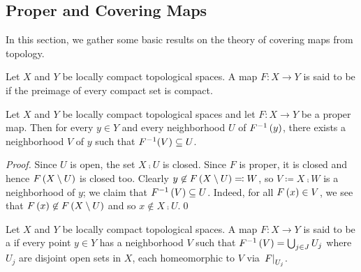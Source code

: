 \documentclass[../Moduli_Spaces_of_Riemann_Surfaces.tex]{subfiles}
\begin{document}
    \subsection{Proper and Covering Maps}
    In this section, we gather some basic results on the theory of covering maps from topology.
    \begin{definition}
        Let $X$ and $Y$ be locally compact topological spaces. A map $F:X\to Y$ is said to be  if the preimage of every compact set is compact.
    \end{definition}
    \begin{lemma}\label{1.3:lem:lemma_for_proper_covering}
        Let $X$ and $Y$ be locally compact topological spaces and let $F:X\to Y$ be a proper map. Then for every $y\in Y$ and every neighborhood $U$ of $F^{-1}\left(y\right)$, there exists a neighborhood $V$ of $y$ such that $F^{-1}\!\left(V\right)\subseteq U$.
    \end{lemma}
    \begin{proof}
        Since $U$ is open, the set $X\comp U$ is closed. Since $F$ is proper, it is closed and hence $F\left(X\setminus U\right)$ is closed too. Clearly $y\not\in F\left(X\setminus U\right)\eqqcolon W$, so $V\coloneqq X\comp W$ is a neighborhood of $y$; we claim that $F^{-1}\left(V\right)\subseteq U$. Indeed, for all $F\left(x\right)\in V$, we see that $F\left(x\right)\not\in F\left(X\setminus U\right)$ and so $x\not\in X\comp U$.\qed
    \end{proof}
    \begin{definition}
        Let $X$ and $Y$ be locally compact topological spaces. A map $F:X\to Y$ is said to be a  if every point $y\in Y$ has a neighborhood $V$ such that $F^{-1}\left(V\right)=\bigcup_{j\in J}U_j$ where $U_j$ are disjoint open sets in $X$, each homeomorphic to $V$ via $\left.F\right|_{U_j}$.
    \end{definition}
\end{document}

